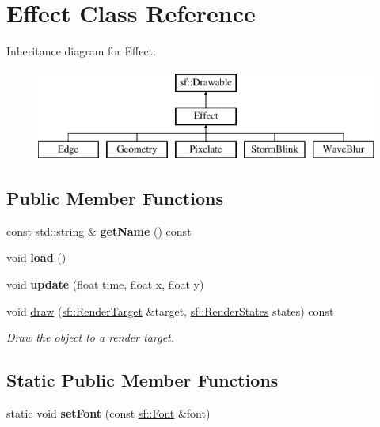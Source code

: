 \hypertarget{class_effect}{}\section{Effect Class Reference}
\label{class_effect}
Inheritance diagram for Effect\+:\begin{figure}[H]
\begin{center}
\leavevmode
\includegraphics[height=3.000000cm]{class_effect}
\end{center}
\end{figure}
\subsection*{Public Member Functions}
\begin{DoxyCompactItemize}
\item 
\mbox{\label{class_effect_ae194f65d0d47fd890f3902dc546c4bb1}} 
const std\+::string \& {\bfseries get\+Name} () const
\item 
\mbox{\label{class_effect_a7f926c8c6b21664461745f4c62cf7d0b}} 
void {\bfseries load} ()
\item 
\mbox{\label{class_effect_a857a5b45439813ecc71e8e931c98f6a2}} 
void {\bfseries update} (float time, float x, float y)
\item 
void \hyperlink{class_effect_a6a3a393e127581c7f84e1278b5be0438}{draw} (\hyperlink{classsf_1_1_render_target}{sf\+::\+Render\+Target} \&target, \hyperlink{classsf_1_1_render_states}{sf\+::\+Render\+States} states) const
\begin{DoxyCompactList}\small\item\em Draw the object to a render target. \end{DoxyCompactList}\end{DoxyCompactItemize}
\subsection*{Static Public Member Functions}
\begin{DoxyCompactItemize}
\item 
\mbox{\label{class_effect_a2a4eaf667af8ea6498b77fe532c5a43d}} 
static void {\bfseries set\+Font} (const \hyperlink{classsf_1_1_font}{sf\+::\+Font} \&font)
\end{DoxyCompactItemize}
